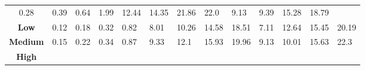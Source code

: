 \begin{table}[H]
{\begin{tabular}{cllll|llll|llll}
            0.28                                               &
            0.39                                               &
            0.64                                               &
            1.99                                               &
            12.44                                              &
            14.35                                              &
            21.86                                              &
            22.0                                               &
            9.13                                               &
            9.39                                               &
            15.28                                              &
            18.79                                                \\
            \textbf{Low}                                       &
            0.12                                               &
            0.18                                               &
            0.32                                               &
            0.82                                               &
            8.01                                               &
            10.26                                              &
            14.58                                              &
            18.51                                              &
            7.11                                               &
            12.64                                              &
            15.45                                              &
            20.19                                                \\
            \textbf{Medium}                                    &
            0.15                                               &
            0.22                                               &
            0.34                                               &
            0.87                                               &
            9.33                                               &
            12.1                                               &
            15.93                                              &
            19.96                                              &
            9.13                                               &
            10.01                                              &
            15.63                                              &
            22.3                                                 \\
            \textbf{High}                                      &

\end{tabular}}
\end{table}
